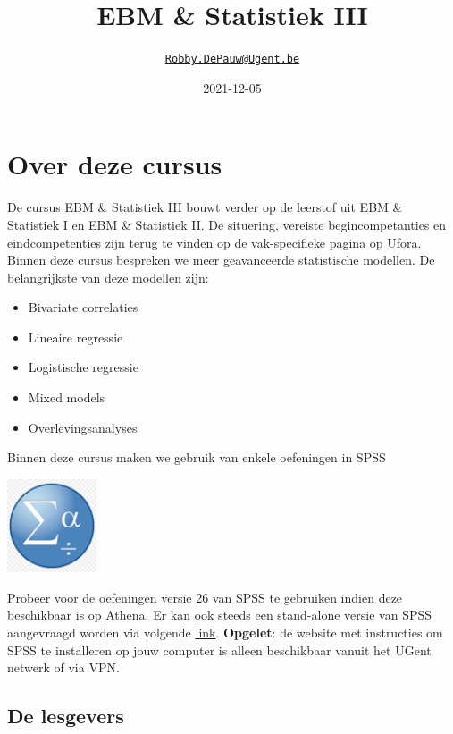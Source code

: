 \documentclass[
]{book}
\title{EBM \& Statistiek III}
\author{\href{mailto:Robby.DePauw@Ugent.be}{\nolinkurl{Robby.DePauw@Ugent.be}}}
\date{2021-12-05}
\providecommand{\tightlist}{%
  \setlength{\itemsep}{0pt}\setlength{\parskip}{0pt}}
\theoremstyle{definition}
\theoremstyle{definition}
\theoremstyle{definition}
\theoremstyle{definition}
\theoremstyle{remark}
\begin{document}
\maketitle

{
\setcounter{tocdepth}{2}
\tableofcontents
}
\hypertarget{over-deze-cursus}{%
\chapter*{Over deze cursus}\label{over-deze-cursus}}


De cursus {EBM \& Statistiek III} bouwt verder op de leerstof uit {EBM \& Statistiek I} en {EBM \& Statistiek II}. De situering, vereiste begincompetanties en eindcompetenties zijn terug te vinden op de vak-specifieke pagina op \href{https://ufora.ugent.be}{Ufora}. Binnen deze cursus bespreken we meer geavanceerde statistische modellen. De belangrijkste van deze modellen zijn:

\begin{itemize}
\tightlist
\item
  Bivariate correlaties
\item
  Lineaire regressie
\item
  Logistische regressie
\item
  Mixed models
\item
  Overlevingsanalyses
\end{itemize}

Binnen deze cursus maken we gebruik van enkele oefeningen in {SPSS}

\includegraphics[width=1.04167in,height=\textheight]{img/spss.png}

Probeer voor de oefeningen versie 26 van {SPSS} te gebruiken indien deze beschikbaar is op Athena. Er kan ook steeds een stand-alone versie van {SPSS} aangevraagd worden via volgende \href{https://helpdesk.ugent.be/athena/}{link}. \textbf{Opgelet}: de website met instructies om {SPSS} te installeren op jouw computer is alleen beschikbaar vanuit het UGent netwerk of via VPN.

\hypertarget{de-lesgevers}{%
\section*{De lesgevers}\label{de-lesgevers}}
\end{document}
